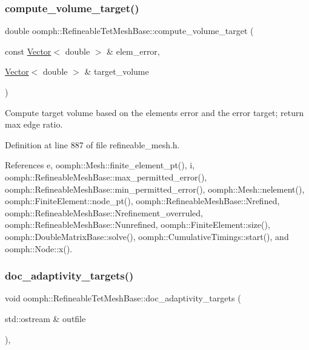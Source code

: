 \subsubsection{\texorpdfstring{compute\+\_\+volume\+\_\+target()}{compute\_volume\_target()}}
{\footnotesize\ttfamily double oomph\+::\+Refineable\+Tet\+Mesh\+Base\+::compute\+\_\+volume\+\_\+target (\begin{DoxyParamCaption}\item[{const \hyperlink{classoomph_1_1Vector}{Vector}$<$ double $>$ \&}]{elem\+\_\+error,  }\item[{\hyperlink{classoomph_1_1Vector}{Vector}$<$ double $>$ \&}]{target\+\_\+volume }\end{DoxyParamCaption})\hspace{0.3cm}{\ttfamily [inline]}}



Compute target volume based on the elements\textquotesingle{} error and the error target; return max edge ratio. 



Definition at line 887 of file refineable\+\_\+mesh.\+h.



References e, oomph\+::\+Mesh\+::finite\+\_\+element\+\_\+pt(), i, oomph\+::\+Refineable\+Mesh\+Base\+::max\+\_\+permitted\+\_\+error(), oomph\+::\+Refineable\+Mesh\+Base\+::min\+\_\+permitted\+\_\+error(), oomph\+::\+Mesh\+::nelement(), oomph\+::\+Finite\+Element\+::node\+\_\+pt(), oomph\+::\+Refineable\+Mesh\+Base\+::\+Nrefined, oomph\+::\+Refineable\+Mesh\+Base\+::\+Nrefinement\+\_\+overruled, oomph\+::\+Refineable\+Mesh\+Base\+::\+Nunrefined, oomph\+::\+Finite\+Element\+::size(), oomph\+::\+Double\+Matrix\+Base\+::solve(), oomph\+::\+Cumulative\+Timings\+::start(), and oomph\+::\+Node\+::x().

\mbox{\label{classoomph_1_1RefineableTetMeshBase_a2e94ec6d2b35b8f84a38a165d9037908}} 
\subsubsection{\texorpdfstring{doc\+\_\+adaptivity\+\_\+targets()}{doc\_adaptivity\_targets()}}
{\footnotesize\ttfamily void oomph\+::\+Refineable\+Tet\+Mesh\+Base\+::doc\+\_\+adaptivity\+\_\+targets (\begin{DoxyParamCaption}\item[{std\+::ostream \&}]{outfile }\end{DoxyParamCaption})\hspace{0.3cm}{\ttfamily [inline]}, {\ttfamily [virtual]}}



